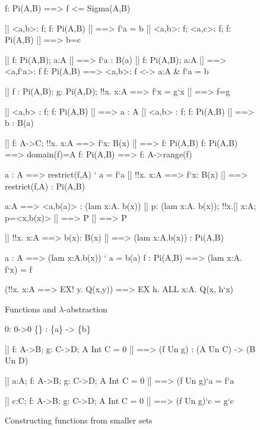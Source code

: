 \begin{figure}
\begin{ttbox}
      f: Pi(A,B) ==> f <= Sigma(A,B)

  [| <a,b>: f;  f: Pi(A,B) |] ==> f`a = b
 [| <a,b>: f;  <a,c>: f;  f: Pi(A,B) |] ==> b=c

      [| f: Pi(A,B);  a:A |] ==> f`a : B(a)
      [| f: Pi(A,B);  a:A |] ==> <a,f`a>: f
       f: Pi(A,B) ==> <a,b>: f <-> a:A & f`a = b

   [| f : Pi(A,B);  g: Pi(A,D);
                   !!x. x:A ==> f`x = g`x     |] ==> f=g

     [| <a,b> : f;  f: Pi(A,B) |] ==> a : A
      [| <a,b> : f;  f: Pi(A,B) |] ==> b : B(a)

         [| f: A->C;  !!x. x:A ==> f`x: B(x) |] ==> f: Pi(A,B)
   f: Pi(A,B) ==> domain(f)=A
    f: Pi(A,B) ==> f: A->range(f)

   a : A ==> restrict(f,A) ` a = f`a
   [| !!x. x:A ==> f`x: B(x) |] ==> 
                restrict(f,A) : Pi(A,B)

       a:A ==> <a,b(a)> : (lam x:A. b(x))
       [| p: (lam x:A. b(x));  !!x.[| x:A; p=<x,b(x)> |] ==> P 
           |] ==>  P

   [| !!x. x:A ==> b(x): B(x) |] ==> (lam x:A.b(x)) : Pi(A,B)

       a : A ==> (lam x:A.b(x)) ` a = b(a)
        f : Pi(A,B) ==> (lam x:A. f`x) = f

   (!!x. x:A ==> EX! y. Q(x,y)) ==> EX h. ALL x:A. Q(x, h`x)
\end{ttbox}
\caption{Functions and $\lambda$-abstraction} \label{ZF-func1}
\end{figure}


\begin{figure}
\begin{ttbox}
            0: 0->0
           \{<a,b>\} : \{a\} -> \{b\}

      [| f: A->B;  g: C->D;  A Int C = 0  |] ==>  
                     (f Un g) : (A Un C) -> (B Un D)

  [| a:A;  f: A->B;  g: C->D;  A Int C = 0 |] ==>  
                     (f Un g)`a = f`a

  [| c:C;  f: A->B;  g: C->D;  A Int C = 0 |] ==>  
                     (f Un g)`c = g`c
\end{ttbox}
\caption{Constructing functions from smaller sets} \label{ZF-func2}
\end{figure}


